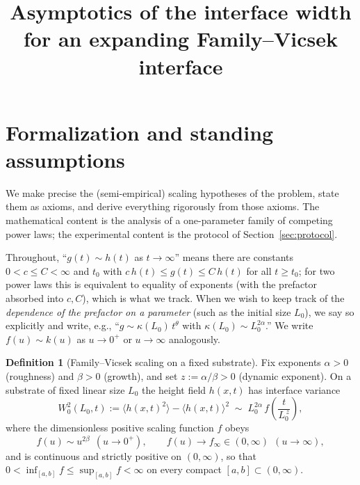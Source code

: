 \documentclass{amsart}
\theoremstyle{definition}
\newtheorem{definition}{Definition}
\newcommand{\asymp}{\sim}
\begin{document}
\title{Asymptotics of the interface width for an expanding Family--Vicsek interface}
\author{}
\date{}
\maketitle

\section{Formalization and standing assumptions}

We make precise the (semi-empirical) scaling hypotheses of the problem, state them
as axioms, and derive everything rigorously from those axioms. The mathematical
content is the analysis of a one-parameter family of competing power laws; the
experimental content is the protocol of Section~\ref{sec:protocol}.

Throughout, ``$g(t)\asymp h(t)$ as $t\to\infty$'' means there are constants
$0<c\le C<\infty$ and $t_0$ with $c\,h(t)\le g(t)\le C\,h(t)$ for all $t\ge t_0$;
for two power laws this is equivalent to equality of exponents (with the prefactor
absorbed into $c,C$), which is what we track. When we wish to keep track of the
\emph{dependence of the prefactor on a parameter} (such as the initial size $L_0$),
we say so explicitly and write, e.g., ``$g\asymp \kappa(L_0)\,t^{\theta}$ with
$\kappa(L_0)\asymp L_0^{2\alpha}$.'' We write $f(u)\asymp k(u)$ as
$u\to0^+$ or $u\to\infty$ analogously.

\begin{definition}[Family--Vicsek scaling on a fixed substrate]\label{def:FV}
Fix exponents $\alpha>0$ (roughness) and $\beta>0$ (growth), and set
$z:=\alpha/\beta>0$ (dynamic exponent). On a substrate of fixed linear size
$L_0$ the height field $h(x,t)$ has interface variance
\begin{equation}\label{eq:FV}
  W_0^2(L_0,t):=\langle h(x,t)^2\rangle-\langle h(x,t)\rangle^2
  \;\asymp\; L_0^{2\alpha}\, f\!\left(\frac{t}{L_0^{\,z}}\right),
\end{equation}
where the dimensionless positive scaling function $f$ obeys
\begin{equation}\label{eq:fasymp}
  f(u)\asymp u^{2\beta}\ \ (u\to 0^+),\qquad
  f(u)\to f_\infty\in(0,\infty)\ \ (u\to\infty),
\end{equation}
and is continuous and strictly positive on $(0,\infty)$, so that
$0<\inf_{[a,b]}f\le\sup_{[a,b]}f<\infty$ on every compact $[a,b]\subset(0,\infty)$.
\end{definition}
\end{document}
